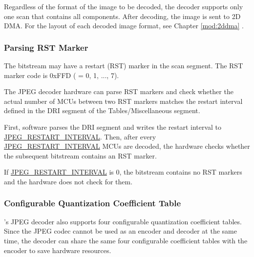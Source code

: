 \documentclass[main\_\_EN.tex]{subfiles}
\begin{document}
Regardless of the format of the image to be decoded, the decoder supports only one scan that contains all components. After decoding, the image is sent to 2D DMA. For the layout of each decoded image format, see Chapter \ref{mod:2ddma} \textit{}.

\subsubsection{Parsing RST Marker}
\label{sec:jpegcodec-dec-rst_marker}

The bitstream may have a restart (RST) marker in the scan segment. The RST marker code is 0xFFD ( = 0, 1, ..., 7).

The JPEG decoder hardware can parse RST markers and check whether the actual number of MCUs between two RST markers matches the restart interval defined in the DRI segment of the Tables/Miscellaneous segment.

First, software parses the DRI segment and writes the restart interval to \hyperref[fielddesc:JPEGRESTARTINTERVAL]{JPEG\_RESTART\_INTERVAL}. Then, after every \hyperref[fielddesc:JPEGRESTARTINTERVAL]{JPEG\_RESTART\_INTERVAL} MCUs are decoded, the hardware checks whether the subsequent bitstream contains an RST marker.

If \hyperref[fielddesc:JPEGRESTARTINTERVAL]{JPEG\_RESTART\_INTERVAL} is 0, the bitstream contains no RST markers and the hardware does not check for them.

\subsubsection{Configurable Quantization Coefficient Table}
\label{sec:jpegcodec-dec-qnr}

\chipname{}'s JPEG decoder also supports four configurable quantization coefficient tables. Since the JPEG codec cannot be used as an encoder and decoder at the same time, the decoder can share the same four configurable coefficient tables with the encoder to save hardware resources.
\end{document}
